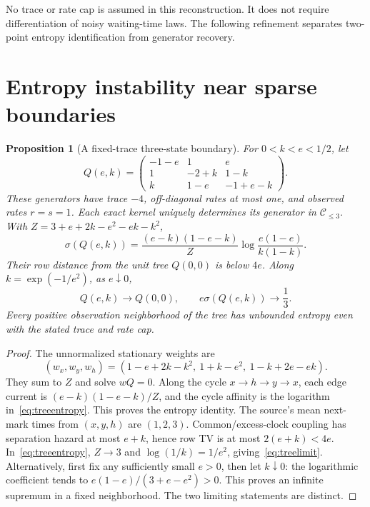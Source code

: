 \documentclass[aps,pre,onecolumn,11pt,longbibliography,notitlepage]{revtex4-2}
\newtheorem{proposition}[theorem]{Proposition}
\newcommand{\1}{\mathbf 1}
\newcommand{\C}{\mathcal C}
\newcommand{\sig}{\sigma}
\begin{document}
No trace or rate cap is assumed in this reconstruction. It does not require differentiation of noisy waiting-time laws. The following refinement separates two-point entropy identification from generator recovery.





\section{Entropy instability near sparse boundaries}\label{sec:sparse}
\begin{proposition}[A fixed-trace three-state boundary]\label{prop:tree}
For $0<k<e<1/2$, let
\begin{equation}
 Q(e,k)=\begin{pmatrix}
 -1-e&1&e\\1&-2+k&1-k\\k&1-e&-1+e-k
 \end{pmatrix}.\label{eq:treefamily}
\end{equation}
These generators have trace $-4$, off-diagonal rates at most one, and observed rates $r=s=1$. Each exact kernel uniquely determines its generator in $\C_{\le3}$. With $Z=3+e+2k-e^2-ek-k^2$,
\begin{equation}
 \sig(Q(e,k))=\frac{(e-k)(1-e-k)}{Z}
 \log\frac{e(1-e)}{k(1-k)}.\label{eq:treeentropy}
\end{equation}
Their row distance from the unit tree $Q(0,0)$ is below $4e$. Along $k=\exp(-1/e^2)$, as $e\downarrow0$,
\begin{equation}
 Q(e,k)\longrightarrow Q(0,0),\qquad e\sig(Q(e,k))\longrightarrow\frac13.\label{eq:treelimit}
\end{equation}
Every positive observation neighborhood of the tree has unbounded entropy even with the stated trace and rate cap.
\end{proposition}

\begin{proof}
The unnormalized stationary weights are
\begin{equation}
 (w_x,w_y,w_h)=(1-e+2k-k^2,\ 1+k-e^2,\ 1-k+2e-ek).
\end{equation}
They sum to $Z$ and solve $wQ=0$. Along the cycle $x\to h\to y\to x$, each edge current is $(e-k)(1-e-k)/Z$, and the cycle affinity is the logarithm in~\eqref{eq:treeentropy}. This proves the entropy identity. The source's mean next-mark times from $(x,y,h)$ are $(1,2,3)$. Common/excess-clock coupling has separation hazard at most $e+k$, hence row TV is at most $2(e+k)<4e$. In~\eqref{eq:treeentropy}, $Z\to3$ and $\log(1/k)=1/e^2$, giving~\eqref{eq:treelimit}. Alternatively, first fix any sufficiently small $e>0$, then let $k\downarrow0$: the logarithmic coefficient tends to $e(1-e)/(3+e-e^2)>0$. This proves an infinite supremum in a fixed neighborhood. The two limiting statements are distinct.
\end{proof}
\end{document}
